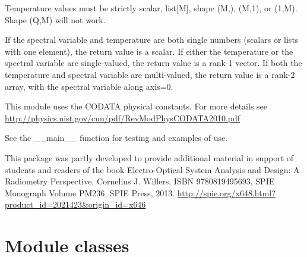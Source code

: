 \documentclass[a4paper,10pt,english]{sphinxmanual}
\begin{document}
Temperature values must be strictly scalar, list{[}M{]}, shape (M,), (M,1), or (1,M).
Shape (Q,M) will not work.

If the spectral variable and temperature are both single numbers (scalars or lists
with one element), the return value is a scalar.  If either the temperature or the
spectral variable are single-valued, the return value is a rank-1 vector. If both
the temperature and spectral variable are multi-valued, the return value is a 
rank-2 array, with the spectral variable along axis=0.

This module uses the CODATA physical constants. For more details see
\href{http://physics.nist.gov/cuu/pdf/RevModPhysCODATA2010.pdf}{http://physics.nist.gov/cuu/pdf/RevModPhysCODATA2010.pdf}

See the \_\_main\_\_ function for testing and examples of use.

This package was partly developed to provide additional material in support of students 
and readers of the book Electro-Optical System Analysis and Design: A Radiometry 
Perspective,  Cornelius J. Willers, ISBN 9780819495693, SPIE Monograph Volume
PM236, SPIE Press, 2013.  \href{http://spie.org/x648.html?product\_id=2021423\&origin\_id=x646}{http://spie.org/x648.html?product\_id=2021423\&origin\_id=x646}


\section{Module classes}
\label{ryplanck:module-classes}
\end{document}
